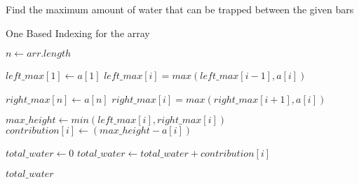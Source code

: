 \documentclass[12pt]{article}
\begin{document}
\begin{algorithm}

  \caption{Find the maximum amount of water that can be trapped between the given bars}
  
  \begin{algorithmic}[1]
    \Ensure One Based Indexing for the array
    \Statex
    
    
        
        \Statex
        \State $n \gets arr.length$
        
        \Statex
        
        \State $left\_max[1] \gets a[1]$
            \State $left\_max[i] = max(left\_max[i-1], a[i])$
        \EndFor
        
        \Statex
        
        \State $right\_max[n] \gets a[n]$
            \State $right\_max[i] = max(right\_max[i+1], a[i])$
        \EndFor
        
        \Statex
        
            \State $max\_height \gets min(left\_max[i], right\_max[i])$
            \State $contribution[i] \gets (max\_height - a[i])$
        \EndFor
        
        \Statex
        
        \State $total\_water \gets 0$
            \State $total\_water \gets total\_water + contribution[i]$
        \EndFor
        
        \Statex
        
        \State \Return $total\_water$
        
    \EndFunction
  \end{algorithmic}
  
\end{algorithm}
\end{document}
